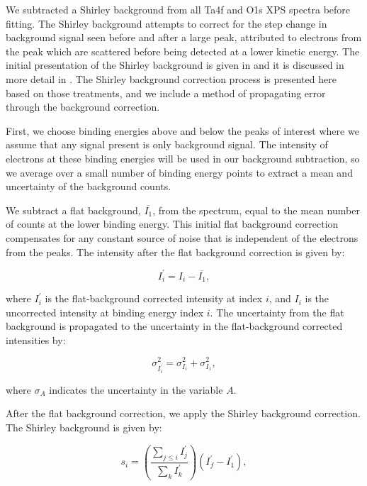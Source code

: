 \documentclass{WileyMSP-template}
\begin{document}
We subtracted a Shirley background from all Ta4f and O1s XPS spectra before fitting. The Shirley background attempts to correct for the step change in background signal seen before and after a large peak, attributed to electrons from the peak which are scattered before being detected at a lower kinetic energy. The initial presentation of the Shirley background is given in \cite{shirley_high-resolution_1972} and it is discussed in more detail in \cite{engelhard_introductory_2020}. The Shirley background correction process is presented here based on those treatments, and we include a method of propagating error through the background correction.

First, we choose binding energies above and below the peaks of interest where we assume that any signal present is only background signal. The intensity of electrons at these binding energies will be used in our background subtraction, so we average over a small number of binding energy points to extract a mean and uncertainty of the background counts.

We subtract a flat background, $\overline{I_1}$, from the spectrum, equal to the mean number of counts at the lower binding energy. This initial flat background correction compensates for any constant source of noise that is independent of the electrons from the peaks. The intensity after the flat background correction is given by:

\begin{equation} \label{eq:flat_background}
    I^{'}_i = I_i - \overline{I_1},
\end{equation}

where $I^{'}_i$ is the flat-background corrected intensity at index $i$, and $I_i$ is the uncorrected intensity at binding energy index $i$. The uncertainty from the flat background is propagated to the uncertainty in the flat-background corrected intensities by:

\begin{equation}\label{eq:flat_error}
    \sigma_{I^{'}_i}^2 = \sigma^2_{I_i} + \sigma^2_{I_1},
\end{equation}
 
 where $\sigma_A$ indicates the uncertainty in the variable $A$.

After the flat background correction, we apply the Shirley background correction. The Shirley background is given by:

\begin{equation} \label{eq:shirley_background}
    s_i = \left(\frac{\sum\limits_{j\leq{}i} I^{'}_j}{\sum\limits_k{I^{'}_k}}\right)(I^{'}_f - I^{'}_1),
\end{equation}
\end{document}
